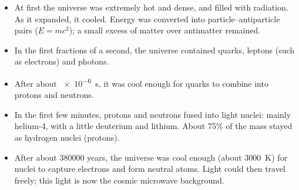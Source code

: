 \documentclass[12pt]{article}
\begin{document}
\ansq
\begin{crit}
\end{crit}
\sample
\begin{itemize}
  \item At first the universe was extremely hot and dense, and filled with radiation. As it expanded, it
        cooled. Energy was converted into particle--antiparticle pairs ($E = mc^2$); a small excess of
        matter over antimatter remained.
  \item In the first fractions of a second, the universe contained quarks, leptons (such as electrons)
        and photons.
  \item After about \qty{e-6}{s}, it was cool enough for quarks to combine into protons and neutrons.
  \item In the first few minutes, protons and neutrons fused into light nuclei: mainly helium-4, with a
        little deuterium and lithium. About 75\% of the mass stayed as hydrogen nuclei (protons).
  \item After about \num{380000} years, the universe was cool enough (about \qty{3000}{K}) for nuclei to
        capture electrons and form neutral atoms. Light could then travel freely; this light is now the
        cosmic microwave background.
\end{itemize}
\end{document}

